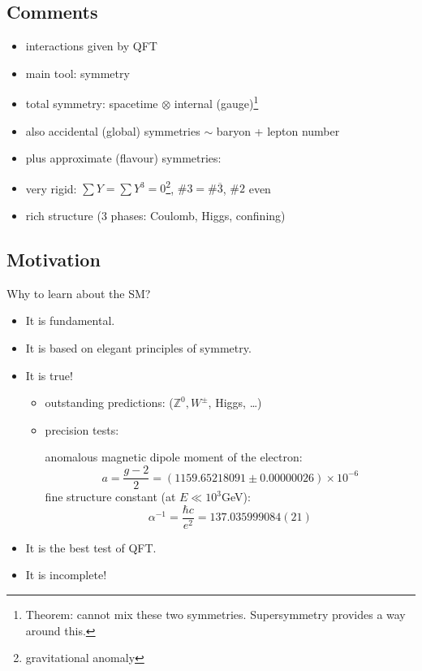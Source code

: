 \subsection*{Comments}%

\begin{itemize}
  \item interactions given by QFT
  \item main tool: symmetry
  \item total symmetry: spacetime $\otimes$ internal (gauge)\footnote{Theorem: cannot mix these two symmetries. Supersymmetry provides a way around this.}
  \item also accidental (global) symmetries $\sim$ baryon + lepton number
  \item plus approximate (flavour) symmetries:
  \item very rigid: $\sum Y = \sum Y^3 = 0$\footnote{gravitational anomaly}, $\#3 = \# \overline{3}$, $\# 2$ even
  \item rich structure (3 phases: Coulomb, Higgs, confining)
\end{itemize}

\subsection*{Motivation}%

Why to learn about the SM?
\begin{itemize}
  \item It is fundamental.
  \item It is based on elegant principles of symmetry.
  \item It is true!
    \begin{itemize}
      \item outstanding predictions: ($\mathbb{Z}^0, W^{\pm}$, Higgs, \dots)
      \item precision tests: \par
	anomalous magnetic dipole moment of the electron: \begin{equation}a = \frac{g - 2}{2} = (1159.65218091 \pm 0.00000026) \times 10^{-6}\end{equation} 
	fine structure constant (at $E \ll 10^3$GeV):
	\begin{equation}
	  \alpha^{-1} = \frac{\hbar c}{e^2} = 137.035999084(21)
	\end{equation}
    \end{itemize}
  \item It is the best test of QFT.
  \item It is incomplete!
\end{itemize}
